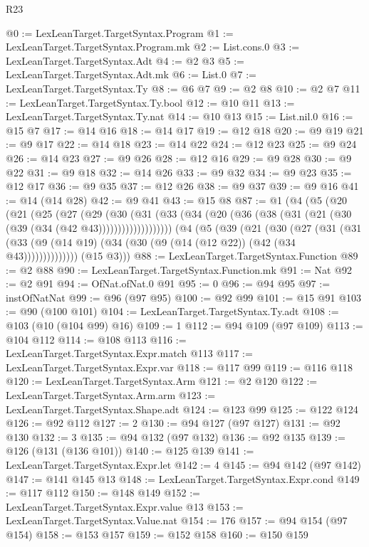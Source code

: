 \begin{lexlean}{R23}
\begin{coremodule}
@0 := LexLeanTarget.TargetSyntax.Program
@1 := LexLeanTarget.TargetSyntax.Program.mk
@2 := List.cons.{0}
@3 := LexLeanTarget.TargetSyntax.Adt
@4 := @2 @3
@5 := LexLeanTarget.TargetSyntax.Adt.mk
@6 := List.{0}
@7 := LexLeanTarget.TargetSyntax.Ty
@8 := @6 @7
@9 := @2 @8
@10 := @2 @7
@11 := LexLeanTarget.TargetSyntax.Ty.bool
@12 := @10 @11
@13 := LexLeanTarget.TargetSyntax.Ty.nat
@14 := @10 @13
@15 := List.nil.{0}
@16 := @15 @7
@17 := @14 @16
@18 := @14 @17
@19 := @12 @18
@20 := @9 @19
@21 := @9 @17
@22 := @14 @18
@23 := @14 @22
@24 := @12 @23
@25 := @9 @24
@26 := @14 @23
@27 := @9 @26
@28 := @12 @16
@29 := @9 @28
@30 := @9 @22
@31 := @9 @18
@32 := @14 @26
@33 := @9 @32
@34 := @9 @23
@35 := @12 @17
@36 := @9 @35
@37 := @12 @26
@38 := @9 @37
@39 := @9 @16
@41 := @14 (@14 @28)
@42 := @9 @41
@43 := @15 @8
@87 := @1
    (@4
      (@5
        (@20
          (@21
            (@25
              (@27
                (@29
                  (@30
                    (@31
                      (@33 (@34 (@20 (@36 (@38 (@31 (@21 (@30 (@39 (@34 (@42 @43)))))))))))))))))))
      (@4
        (@5
          (@39
            (@21
              (@30
                (@27
                  (@31
                    (@31
                      (@33 (@9 (@14 @19) (@34 (@30 (@9 (@14 (@12 @22)) (@42 (@34 @43))))))))))))))
        (@15 @3)))
@88 := LexLeanTarget.TargetSyntax.Function
@89 := @2 @88
@90 := LexLeanTarget.TargetSyntax.Function.mk
@91 := Nat
@92 := @2 @91
@94 := OfNat.ofNat.{0} @91
@95 := 0
@96 := @94 @95
@97 := instOfNatNat
@99 := @96 (@97 @95)
@100 := @92 @99
@101 := @15 @91
@103 := @90 (@100 @101)
@104 := LexLeanTarget.TargetSyntax.Ty.adt
@108 := @103 (@10 (@104 @99) @16)
@109 := 1
@112 := @94 @109 (@97 @109)
@113 := @104 @112
@114 := @108 @113
@116 := LexLeanTarget.TargetSyntax.Expr.match @113
@117 := LexLeanTarget.TargetSyntax.Expr.var
@118 := @117 @99
@119 := @116 @118
@120 := LexLeanTarget.TargetSyntax.Arm
@121 := @2 @120
@122 := LexLeanTarget.TargetSyntax.Arm.arm
@123 := LexLeanTarget.TargetSyntax.Shape.adt
@124 := @123 @99
@125 := @122 @124
@126 := @92 @112
@127 := 2
@130 := @94 @127 (@97 @127)
@131 := @92 @130
@132 := 3
@135 := @94 @132 (@97 @132)
@136 := @92 @135
@139 := @126 (@131 (@136 @101))
@140 := @125 @139
@141 := LexLeanTarget.TargetSyntax.Expr.let
@142 := 4
@145 := @94 @142 (@97 @142)
@147 := @141 @145 @13
@148 := LexLeanTarget.TargetSyntax.Expr.cond
@149 := @117 @112
@150 := @148 @149
@152 := LexLeanTarget.TargetSyntax.Expr.value @13
@153 := LexLeanTarget.TargetSyntax.Value.nat
@154 := 176
@157 := @94 @154 (@97 @154)
@158 := @153 @157
@159 := @152 @158
@160 := @150 @159

\end{coremodule}
\end{lexlean}
